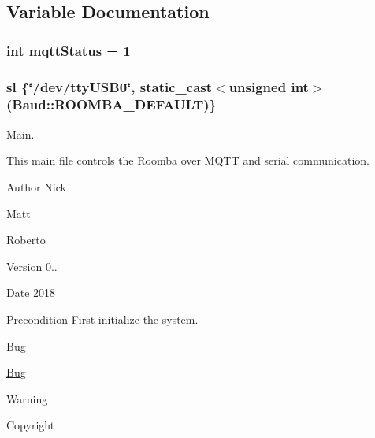 \subsection{Variable Documentation}
\subsubsection[{\texorpdfstring{mqtt\+Status}{mqttStatus}}]{\setlength{\rightskip}{0pt plus 5cm}int mqtt\+Status = 1}\hypertarget{_pi-in-the-sky_8cpp_af28aa3fad3574f60f4f6a9b2f01ccff0}{}\label{_pi-in-the-sky_8cpp_af28aa3fad3574f60f4f6a9b2f01ccff0}
\subsubsection[{\texorpdfstring{sl}{sl}}]{ sl \{\char`\"{}/dev/tty\+U\+S\+B0\char`\"{}, static\+\_\+cast$<$unsigned int$>$({\bf Baud\+::\+R\+O\+O\+M\+B\+A\+\_\+\+D\+E\+F\+A\+U\+LT})\}}\hypertarget{_pi-in-the-sky_8cpp_a4b5d2a4822c9b9ecddf5750239626d47}{}\label{_pi-in-the-sky_8cpp_a4b5d2a4822c9b9ecddf5750239626d47}


Main. 

This main file controls the Roomba over M\+Q\+TT and serial communication. \begin{DoxyAuthor}{Author}
Nick 

Matt 

Roberto 
\end{DoxyAuthor}
\begin{DoxyVersion}{Version}
0.. 
\end{DoxyVersion}
\begin{DoxyDate}{Date}
2018 
\end{DoxyDate}
\begin{DoxyPrecond}{Precondition}
First initialize the system. 
\end{DoxyPrecond}
\begin{DoxyRefDesc}{Bug}
\item[\hyperlink{bug__bug000001}{Bug}]\end{DoxyRefDesc}
\begin{DoxyWarning}{Warning}

\end{DoxyWarning}
\begin{DoxyCopyright}{Copyright}

\end{DoxyCopyright}

